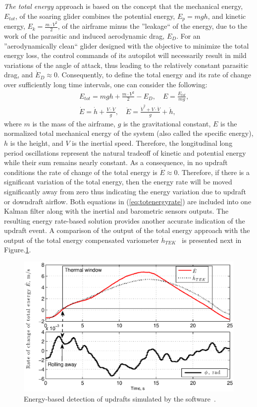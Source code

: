 \documentclass[letterpaper, 10 pt, conference]{ieeeconf}  %
\begin{document}
\emph{The total energy} approach is based on the concept that the mechanical energy, $E_{tot}$, of
the soaring glider combines the potential energy, $E_p=mgh$, and kinetic energy, $E_k=\frac{m\cdot V^2}{2}$, of the airframe minus the ''leakage`` of the energy, due to the work of the parasitic and induced aerodynamic drag, $E_{D}$. For an ''aerodynamically clean`` glider designed with the objective to minimize the total energy loss, the control commands of its autopilot will necessarily result in mild variations of the angle of attack, thus leading to the relatively constant parasitic drag, and $\dot{E}_{D}\approx0$. Consequently, to define the total energy and its rate of change over sufficiently
long time intervals, one can consider the following:
\begin{eqnarray}
    && E_{tot}=mgh+\frac{m\cdot V^2}{2}-E_{D}, \quad E=\frac{E_{tot}}{mg}, \nonumber \\
    && \dot{E}=\dot{h}+\frac{V \cdot \dot{V}}{g}, \quad \ddot{E}=\frac{\dot{V}^2 + V \cdot
    \ddot{V}}{g} + \ddot{h},
    \label{eq:totenergyrate}
\end{eqnarray}
where $m$ is the mass of the airframe, $g$ is the gravitational constant, $E$ is the normalized total mechanical energy of the system (also called the specific energy), $h$ is the height, and $V$ is the inertial speed. Therefore, the longitudinal long period oscillations represent the natural tradeoff of kinetic and potential energy while their sum remains nearly constant. As a consequence, in no updraft conditions the rate of change of the total energy is $\dot{E}\approx 0$. Therefore, if there is a significant variation of the total energy, then the energy rate will be moved significantly away from zero thus indicating the energy variation due to updraft or downdraft airflow. Both equations in (\ref{eq:totenergyrate}) are included into one Kalman filter along with the inertial and barometric sensors outputs. The resulting energy rate-based solution provides another accurate indication of the updraft event. A comparison of the output of the total energy approach with the output of the total energy compensated variometer $\dot{h}_{TEK}$~\cite{PitLab:2013:Online} is presented next in Figure.\ref{fig:ThermalDetection}.
\begin{figure}[thpb]
  \centering
  \includegraphics[scale=0.4]{Figures/TEK_Bank.eps}
  \caption{Energy-based detection of updrafts simulated by the software~\cite{Condor:2013:Online}.}
  \label{fig:ThermalDetection}
\end{figure}
\end{document}
